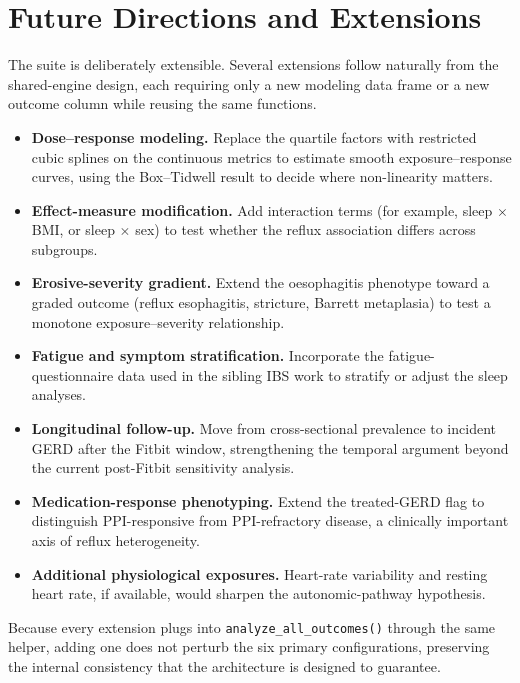 \documentclass[11pt]{article}
\newcommand{\code}[1]{\texttt{\small #1}}
\begin{document}
\section{Future Directions and Extensions}
The suite is deliberately extensible. Several extensions follow naturally from the shared-engine design,
each requiring only a new modeling data frame or a new outcome column while reusing the same functions.
\begin{itemize}[leftmargin=1.4em,itemsep=2pt]
  \item \textbf{Dose--response modeling.} Replace the quartile factors with restricted cubic splines on
  the continuous metrics to estimate smooth exposure--response curves, using the Box--Tidwell result to
  decide where non-linearity matters.
  \item \textbf{Effect-measure modification.} Add interaction terms (for example, sleep $\times$ BMI, or
  sleep $\times$ sex) to test whether the reflux association differs across subgroups.
  \item \textbf{Erosive-severity gradient.} Extend the oesophagitis phenotype toward a graded outcome
  (reflux esophagitis, stricture, Barrett metaplasia) to test a monotone exposure--severity relationship.
  \item \textbf{Fatigue and symptom stratification.} Incorporate the fatigue-questionnaire data used in
  the sibling IBS work to stratify or adjust the sleep analyses.
  \item \textbf{Longitudinal follow-up.} Move from cross-sectional prevalence to incident GERD after the
  Fitbit window, strengthening the temporal argument beyond the current post-Fitbit sensitivity analysis.
  \item \textbf{Medication-response phenotyping.} Extend the treated-GERD flag to distinguish
  PPI-responsive from PPI-refractory disease, a clinically important axis of reflux heterogeneity.
  \item \textbf{Additional physiological exposures.} Heart-rate variability and resting heart rate, if
  available, would sharpen the autonomic-pathway hypothesis.
\end{itemize}
Because every extension plugs into \code{analyze_all_outcomes()} through the same helper, adding one does
not perturb the six primary configurations, preserving the internal consistency that the architecture is
designed to guarantee.

\end{document}
